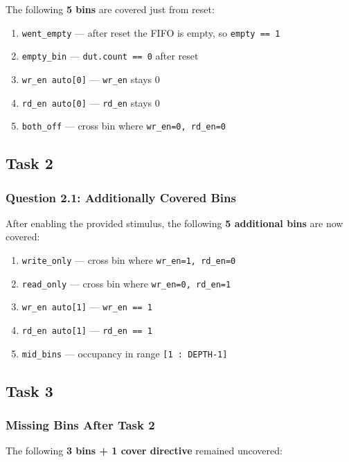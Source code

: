 \documentclass[11pt]{article}
\begin{document}
The following \textbf{5 bins} are covered just from reset:

\begin{enumerate}
  \item \texttt{went\_empty} --- after reset the FIFO is empty, so \texttt{empty == 1}
  \item \texttt{empty\_bin} --- \texttt{dut.count == 0} after reset
  \item \texttt{wr\_en auto[0]} --- \texttt{wr\_en} stays 0
  \item \texttt{rd\_en auto[0]} --- \texttt{rd\_en} stays 0
  \item \texttt{both\_off} --- cross bin where \texttt{wr\_en=0, rd\_en=0}
\end{enumerate}

\subsection*{Task 2}

\subsubsection*{Question 2.1: Additionally Covered Bins}

After enabling the provided stimulus, the following \textbf{5 additional bins} are now covered:

\begin{enumerate}
  \item \texttt{write\_only} --- cross bin where \texttt{wr\_en=1, rd\_en=0}
  \item \texttt{read\_only} --- cross bin where \texttt{wr\_en=0, rd\_en=1}
  \item \texttt{wr\_en auto[1]} --- \texttt{wr\_en == 1}
  \item \texttt{rd\_en auto[1]} --- \texttt{rd\_en == 1}
  \item \texttt{mid\_bins} --- occupancy in range \texttt{[1 : DEPTH-1]}
\end{enumerate}

\subsection*{Task 3}

\subsubsection*{Missing Bins After Task 2}

The following \textbf{3 bins + 1 cover directive} remained uncovered:
\end{document}
